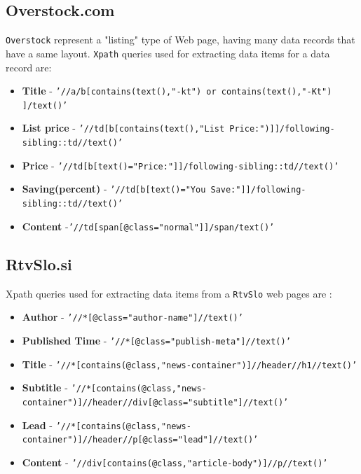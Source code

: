\documentclass{article}
\begin{document}
	\subsection{Overstock.com}
	\texttt{Overstock} represent a "listing" type of Web page, having many data records that have a same layout. \texttt{Xpath} queries used for extracting data items for a data record are:
	\begin{itemize}
		\item \textbf{Title} - \texttt{'//a/b[contains(text(),"-kt") or contains(text(),"-Kt") ]/text()'} 
		\item \textbf{List price} - \texttt{'//td[b[contains(text(),"List Price:")]]/following-sibling::td//text()'} 
		\item \textbf{Price} - \texttt{'//td[b[text()="Price:"]]/following-sibling::td//text()'} 
		\item \textbf{Saving(percent)} - \texttt{'//td[b[text()="You Save:"]]/following-sibling::td//text()'} 
		\item \textbf{Content}  -\texttt{'//td[span[@class="normal"]]/span/text()'} 
	\end{itemize}
	
	\subsection{RtvSlo.si}
	Xpath queries used for extracting data items from a \texttt{RtvSlo} web pages are :
	\begin{itemize}
		\item \textbf{Author} - \texttt{'//*[@class="author-name"]//text()'}  
		\item \textbf{Published Time} - \texttt{'//*[@class="publish-meta"]//text()'} 
		\item \textbf{Title} - \texttt{'//*[contains(@class,"news-container")]//header//h1//text()'}  
		\item \textbf{Subtitle} - \texttt{'//*[contains(@class,"news-container")]//header//div[@class="subtitle"]//text()'}  
		\item \textbf{Lead} - \texttt{'//*[contains(@class,"news-container")]//header//p[@class="lead"]//text()'}  
		\item \textbf{Content} - \texttt{'//div[contains(@class,"article-body")]//p//text()'} 
	\end{itemize}
	
\end{document}
